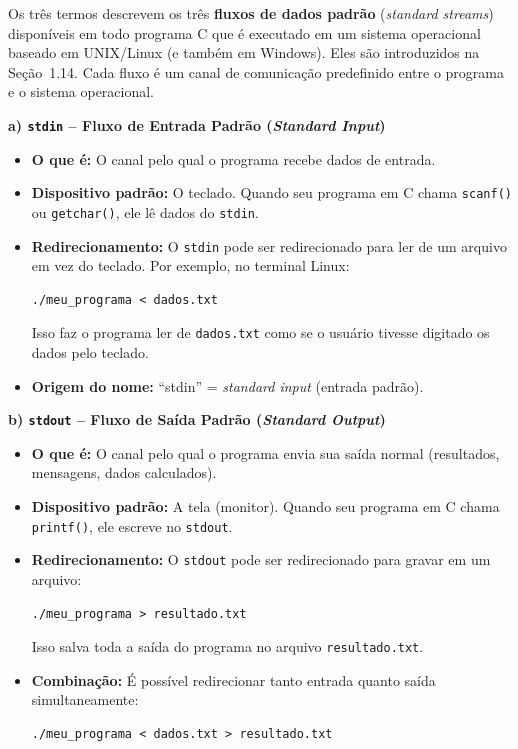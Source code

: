 \documentclass[12pt,a4paper]{article}
\begin{document}
\bigskip

\begin{respostabox}

Os três termos descrevem os três \textbf{fluxos de dados padrão} (\textit{standard
streams}) disponíveis em todo programa C que é executado em um sistema operacional
baseado em UNIX/Linux (e também em Windows). Eles são introduzidos na Seção~1.14.
Cada fluxo é um canal de comunicação predefinido entre o programa e o sistema operacional.

\medskip

\textbf{a) \texttt{stdin} -- Fluxo de Entrada Padrão (\textit{Standard Input})}

\begin{itemize}
  \item \textbf{O que é:} O canal pelo qual o programa recebe dados de entrada.
  \item \textbf{Dispositivo padrão:} O teclado. Quando seu programa em C chama
  \texttt{scanf()} ou \texttt{getchar()}, ele lê dados do \texttt{stdin}.
  \item \textbf{Redirecionamento:} O \texttt{stdin} pode ser redirecionado para ler de um
  arquivo em vez do teclado. Por exemplo, no terminal Linux:
  \begin{lstlisting}
./meu_programa < dados.txt
  \end{lstlisting}
  Isso faz o programa ler de \texttt{dados.txt} como se o usuário tivesse digitado
  os dados pelo teclado.
  \item \textbf{Origem do nome:} ``stdin'' = \textit{standard input} (entrada padrão).
\end{itemize}

\bigskip

\textbf{b) \texttt{stdout} -- Fluxo de Saída Padrão (\textit{Standard Output})}

\begin{itemize}
  \item \textbf{O que é:} O canal pelo qual o programa envia sua saída normal (resultados,
  mensagens, dados calculados).
  \item \textbf{Dispositivo padrão:} A tela (monitor). Quando seu programa em C chama
  \texttt{printf()}, ele escreve no \texttt{stdout}.
  \item \textbf{Redirecionamento:} O \texttt{stdout} pode ser redirecionado para gravar em
  um arquivo:
  \begin{lstlisting}
./meu_programa > resultado.txt
  \end{lstlisting}
  Isso salva toda a saída do programa no arquivo \texttt{resultado.txt}.
  \item \textbf{Combinação:} É possível redirecionar tanto entrada quanto saída
  simultaneamente:
  \begin{lstlisting}
./meu_programa < dados.txt > resultado.txt
  \end{lstlisting}
\end{itemize}


\end{respostabox}
\end{document}
